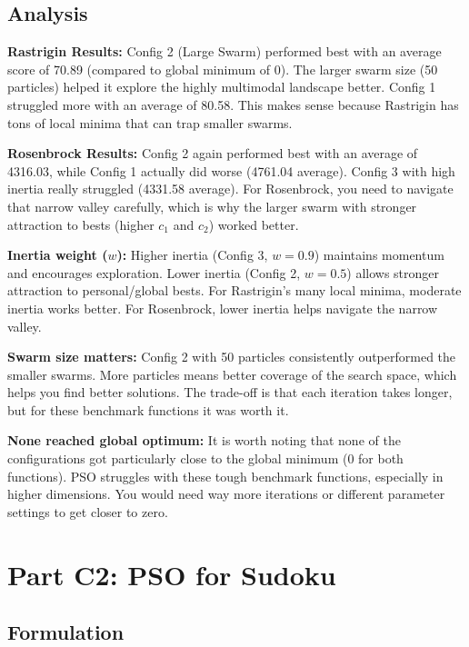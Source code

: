 \documentclass[letterpaper]{article}
\begin{document}
\subsection{Analysis}

\textbf{Rastrigin Results:} Config 2 (Large Swarm) performed best with an average score of 70.89 (compared to global minimum of 0). The larger swarm size (50 particles) helped it explore the highly multimodal landscape better. Config 1 struggled more with an average of 80.58. This makes sense because Rastrigin has tons of local minima that can trap smaller swarms.

\textbf{Rosenbrock Results:} Config 2 again performed best with an average of 4316.03, while Config 1 actually did worse (4761.04 average). Config 3 with high inertia really struggled (4331.58 average). For Rosenbrock, you need to navigate that narrow valley carefully, which is why the larger swarm with stronger attraction to bests (higher $c_1$ and $c_2$) worked better.

\textbf{Inertia weight (}$w$\textbf{):} Higher inertia (Config 3, $w=0.9$) maintains momentum and encourages exploration. Lower inertia (Config 2, $w=0.5$) allows stronger attraction to personal/global bests. For Rastrigin's many local minima, moderate inertia works better. For Rosenbrock, lower inertia helps navigate the narrow valley.

\textbf{Swarm size matters:} Config 2 with 50 particles consistently outperformed the smaller swarms. More particles means better coverage of the search space, which helps you find better solutions. The trade-off is that each iteration takes longer, but for these benchmark functions it was worth it.

\textbf{None reached global optimum:} It is worth noting that none of the configurations got particularly close to the global minimum (0 for both functions). PSO struggles with these tough benchmark functions, especially in higher dimensions. You would need way more iterations or different parameter settings to get closer to zero.

\section{Part C2: PSO for Sudoku}

\subsection{Formulation}
\end{document}
